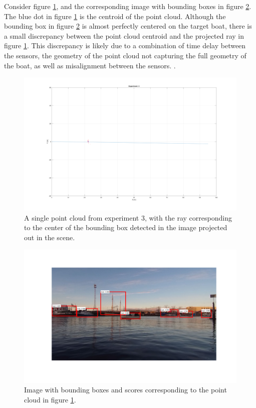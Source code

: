 Consider figure \ref{fig:example_ex3_pc}, and the corresponding image with bounding boxes in figure \ref{fig:example_ex3_im}. The blue dot in figure \ref{fig:example_ex3_pc} is the centroid of the point cloud. Although the bounding box in figure \ref{fig:example_ex3_im} is almost perfectly centered on the target boat, there is a small discrepancy between the point cloud centroid and the projected ray in figure \ref{fig:example_ex3_pc}. This discrepancy is likely due to a combination of time delay between the sensors, the geometry of the point cloud not capturing the full geometry of the boat, as well as misalignment between the sensors. .
\begin{figure}[H]
	\centering
	\includegraphics[width=\linewidth]{fig/example_1_pc.png}
	\caption{A single point cloud from experiment 3, with the ray corresponding to the center of the bounding box detected in the image projected out in the scene.}
	\label{fig:example_ex3_pc}
\end{figure}
\begin{figure}[H]
	\centering
	\includegraphics[width=\linewidth]{fig/example_1.png}
	\caption{Image with bounding boxes and scores corresponding to the point cloud in figure \ref{fig:example_ex3_pc}.}
	\label{fig:example_ex3_im}
\end{figure}
